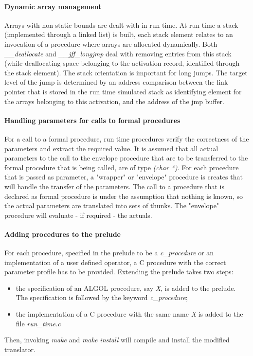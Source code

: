 \documentclass[11pt]{article}
\begin{document}
\paragraph{Dynamic array management}
Arrays with non static bounds are dealt with in run time. At run time
a stack (implemented through a linked list) is built, each stack element
relates to an invocation of a procedure where arrays are allocated
dynamically. Both {\em \_\_deallocate} and {\em \_\_jff\_longjmp}
deal with removing entries from this stack (while deallocating space belonging
to the activation record, identified through the stack element).
The stack orientation is important for
long jumps. The target level of the jump is determined
by an address comparison between the link pointer that is stored
in the run time simulated stack as identifying element for the arrays
belonging to this activation, and the address of the jmp buffer.
\paragraph{Handling parameters for calls to formal procedures}
For a call to a formal procedure, run time procedures verify the
correctness of the parameters and extract the required value.
It is assumed that all actual parameters to the call to the envelope procedure
that are to be transferred to the formal procedure that is being called,
are of type {\em (char *)}.  
For each procedure that is passed as parameter, a "wrapper" or "envelope"
procedure is creates that will handle the transfer of the
parameters. The call to a procedure that is declared as formal procedure
is under the assumption that nothing is known, so the actual parameters
are translated into sets of thunks. The "envelope" procedure will
evaluate - if required - the actuals.
\paragraph{Adding procedures to the prelude}
For each procedure, specified in the prelude to be a {\em c\_procedure}
or an implementation of a user defined operator,
a C procedure with the correct parameter profile
has to be provided. Extending the prelude takes two steps:
\begin{itemize}
\item the specification of an ALGOL procedure, say {\em X},
is added to the prelude.
The specification is followed by the keyword {\em c\_procedure};
\item the implementation of a C procedure with the
same name {\em X} is added to the file {\em run\_time.c}
\end{itemize}
Then, invoking {\em make} and {\em make install}
will compile and install the modified
translator.
\end{document}
